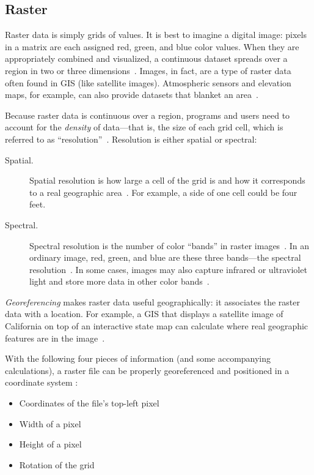 \subsection{Raster}
\label{sec:raster}
Raster data is simply grids of values. It is best to imagine a digital image: pixels in a matrix are each assigned red, green, and blue color values. When they are appropriately combined and visualized, a continuous dataset spreads over a region in two or three dimensions~\cite{gentle_intro}. Images, in fact, are a type of raster data often found in GIS (like satellite images). Atmospheric sensors and elevation maps, for example, can also provide datasets that blanket an area~\cite{gentle_intro}.

Because raster data is continuous over a region, programs and users need to account for the \textit{density} of data---that is, the size of each grid cell, which is referred to as ``resolution''~\cite{gentle_intro}. Resolution is either spatial or spectral:

\begin{description}
  \item[Spatial.] Spatial resolution is how large a cell of the grid is and how it corresponds to a real geographic area~\cite{gentle_intro}. For example, a side of one cell could be four feet.
  \item[Spectral.] Spectral resolution is the number of color ``bands'' in raster images~\cite{gentle_intro}. In an ordinary image, red, green, and blue are these three bands---the spectral resolution~\cite{gentle_intro}. In some cases, images may also capture infrared or ultraviolet light and store more data in other color bands~\cite{gentle_intro}.
\end{description}

\textit{Georeferencing} makes raster data useful geographically: it associates the raster data with a location. For example, a GIS that displays a satellite image of California on top of an interactive state map can calculate where real geographic features are in the image~\cite{gentle_intro}.

With the following four pieces of information (and some accompanying calculations), a raster file can be properly georeferenced and positioned in a coordinate system \cite{gentle_intro}:

\begin{itemize}
  \item Coordinates of the file's top-left pixel
  \item Width of a pixel
  \item Height of a pixel
  \item Rotation of the grid
\end{itemize}


